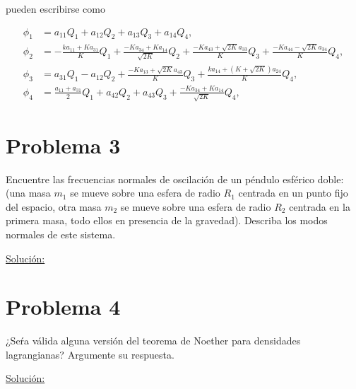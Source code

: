 \documentclass[a4paper,10pt]{article}
\numberwithin{equation}{section}
\begin{document}
pueden escribirse como

\begin{align*}
 \phi_1 &= a_{11}Q_1 + a_{12}Q_2 + a_{13}Q_3 + a_{14}Q_4, \\
 \phi_2 &= - \frac{ka_{11} + Ka_{31}}{K}Q_1 + \frac{-K a_{34} + Ka_{14}}{\sqrt{2K}}Q_2 + 
 \frac{- Ka_{43} + \sqrt{2K}a_{33}}{K}Q_3 + \frac{- Ka_{44} - \sqrt{2K}a_{34}}{K}Q_4, \\
 \phi_3 &= a_{31}Q_1 - a_{12}Q_2 + \frac{-Ka_{13} + \sqrt{2K}a_{43}}{K}Q_3 + 
 \frac{ka_{14} + (K + \sqrt{2K})a_{24}}{K}Q_4, \\
 \phi_4 &=  \frac{a_{11} + a_{31}}{2}Q_1 + a_{42}Q_2 + a_{43}Q_3 + 
 \frac{-K a_{34} + Ka_{14}}{\sqrt{2K}}Q_4,
\end{align*}





\section{Problema 3}

Encuentre las frecuencias normales de oscilación de un péndulo esférico doble: (una 
masa $m_1$ se mueve sobre una esfera de radio $R_1$ centrada en un punto fijo del 
espacio, otra masa $m_2$ se mueve sobre una esfera de radio $R_2$ centrada en la 
primera masa, todo ellos en presencia de la gravedad). Describa los modos normales 
de este sistema.

\vspace{.3cm}

\underline{Solución:} \vspace{.3cm}

\section{Problema 4}

¿Seŕa válida alguna versión del teorema de Noether para densidades lagrangianas? Argumente 
su respuesta.

\vspace{.3cm}

\underline{Solución:} \vspace{.3cm}
\end{document}
